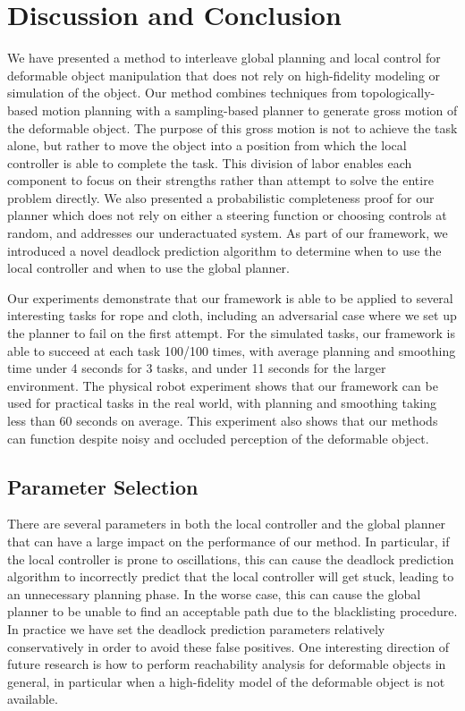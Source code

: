 \section{Discussion and Conclusion}
\label{sec:discussion}

We have presented a method to interleave global planning and local control for deformable object manipulation that does not rely on high-fidelity modeling or simulation of the object. Our method combines techniques from topologically-based motion planning with a sampling-based planner to generate gross motion of the deformable object. The purpose of this gross motion is not to achieve the task alone, but rather to move the object into a position from which the local controller is able to complete the task. This division of labor enables each component to focus on their strengths rather than attempt to solve the entire problem directly. We also presented a probabilistic completeness proof for our planner which does not rely on either a steering function or choosing controls at random, and addresses our underactuated system. As part of our framework, we introduced a novel deadlock prediction algorithm to determine when to use the local controller and when to use the global planner.

Our experiments demonstrate that our framework is able to be applied to several interesting tasks for rope and cloth, including an adversarial case where we set up the planner to fail on the first attempt. For the simulated tasks, our framework is able to succeed at each task 100/100 times, with average planning and smoothing time under 4 seconds for 3 tasks, and under 11 seconds for the larger environment. The physical robot experiment shows that our framework can be used for practical tasks in the real world, with planning and smoothing taking less than 60 seconds on average. This experiment also shows that our methods can function despite noisy and occluded perception of the deformable object.

\subsection{Parameter Selection}
There are several parameters in both the local controller and the global planner that can have a large impact on the performance of our method. In particular, if the local controller is prone to oscillations, this can cause the deadlock prediction algorithm to incorrectly predict that the local controller will get stuck, leading to an unnecessary planning phase. In the worse case, this can cause the global planner to be unable to find an acceptable path due to the blacklisting procedure. In practice we have set the deadlock prediction parameters relatively conservatively in order to avoid these false positives. One interesting direction of future research is how to perform reachability analysis for deformable objects in general, in particular when a high-fidelity model of the deformable object is not available.


